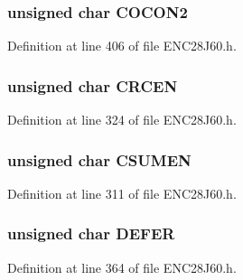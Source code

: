 \hypertarget{union___r_e_g_a049ea33f8439a162b4aa445a1ba9e1e8}{}
\subsubsection[{C\+O\+C\+O\+N2}]{\setlength{\rightskip}{0pt plus 5cm}unsigned {\bf char} C\+O\+C\+O\+N2}\label{union___r_e_g_a049ea33f8439a162b4aa445a1ba9e1e8}


Definition at line 406 of file E\+N\+C28\+J60.\+h.

\hypertarget{union___r_e_g_affcbaac6ee48a0629b65e54fecdbe5e9}{}
\subsubsection[{C\+R\+C\+E\+N}]{\setlength{\rightskip}{0pt plus 5cm}unsigned {\bf char} C\+R\+C\+E\+N}\label{union___r_e_g_affcbaac6ee48a0629b65e54fecdbe5e9}


Definition at line 324 of file E\+N\+C28\+J60.\+h.

\hypertarget{union___r_e_g_a2499bc058cd08ff53b2b2dda91b6b856}{}
\subsubsection[{C\+S\+U\+M\+E\+N}]{\setlength{\rightskip}{0pt plus 5cm}unsigned {\bf char} C\+S\+U\+M\+E\+N}\label{union___r_e_g_a2499bc058cd08ff53b2b2dda91b6b856}


Definition at line 311 of file E\+N\+C28\+J60.\+h.

\hypertarget{union___r_e_g_a2add9cdb1deb31359f827806da3e45fb}{}
\subsubsection[{D\+E\+F\+E\+R}]{\setlength{\rightskip}{0pt plus 5cm}unsigned {\bf char} D\+E\+F\+E\+R}\label{union___r_e_g_a2add9cdb1deb31359f827806da3e45fb}


Definition at line 364 of file E\+N\+C28\+J60.\+h.

